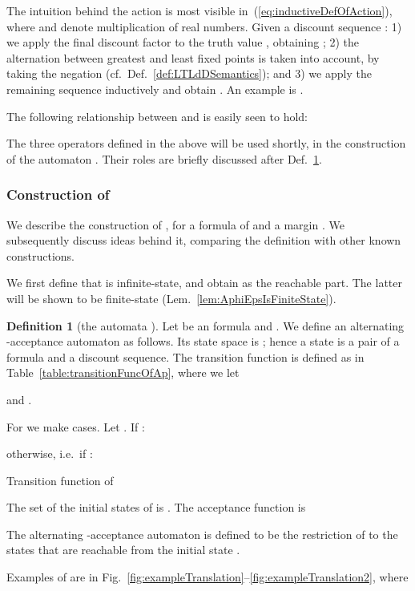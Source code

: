 \documentclass[a4paper,USenglish,numberwithinsect]{lipics}
\newif\ifignore \ignorefalse
\newcommand{\auxproof}[1]{
\ifignore\mbox{}\newline
\textbf{BEGIN: AUX-PROOF} \dotfill\newline
{#1}\mbox{}\newline
\textbf{END: AUX-PROOF}\dotfill\newline
\fi}
\theoremstyle{definition}
\newtheorem{defi}{Definition}[section]
\theoremstyle{remark}
\theoremstyle{plain}
\begin{document}
The intuition behind the action  is most visible
in~(\ref{eq:inductiveDefOfAction}), where  and  denote
multiplication of real numbers. Given a discount sequence
:  1) we apply the final discount factor  to 
the truth value , obtaining ; 2) the alternation between 
greatest and least fixed points is taken into account, by taking
the negation  (cf.\ Def.~\ref{def:LTLdDSemantics}); and
 3)
we apply the remaining sequence  inductively and obtain . An example is
.

 The following  relationship between 
and  is easily seen to hold:


The three operators  defined in the above 
will be used shortly, in the construction of the automaton
. Their roles are briefly discussed after Def.~\ref{def:ABAforLTL}.

\subsubsection{Construction of }
 We  describe the construction of ,
for a formula  of  and a margin
.  We subsequently discuss  ideas
behind it, comparing the definition with other known constructions.


We first define 
 that is infinite-state, and obtain 
 as the reachable part. The latter will be shown to
be finite-state (Lem.~\ref{lem:AphiEpsIsFiniteState}).

\begin{defi}[the automata ]\label{def:ABAforLTL}
  Let  be an   formula and . We define an alternating {}-acceptance automaton
  as
 follows. 
 Its state space  is ; hence a state is a pair  of a formula and a discount sequence.
The transition function  is defined as 
in Table~\ref{table:transitionFuncOfAp}, where we let
 
 and  .
\begin{table}[tbp]\centering
\small
  
\begin{minipage}{\textwidth}\small
 For  we make cases. Let 
	 . If
:
	  
	  otherwise, i.e.\ if 	 :
   
\end{minipage}
\caption{Transition function  of }
 \label{table:transitionFuncOfAp}
\end{table}


  The set  of the initial states of  is . The acceptance function  is
  

 The alternating -acceptance automaton 
 is defined to be the restriction of   to the states that
 are
 reachable from the initial state . 
\end{defi}
\auxproof{To slightly optimize the automaton one can take
 .
}
Examples of  are
in Fig.~\ref{fig:exampleTranslation}--\ref{fig:exampleTranslation2},
where
\end{document}
